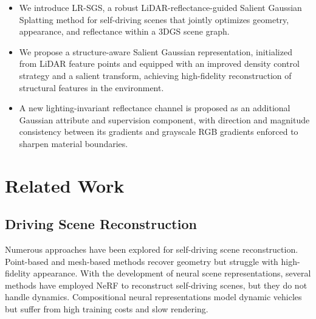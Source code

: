\documentclass[letterpaper, 10 pt, conference]{ieeeconf}  %
\begin{document}
\begin{itemize}

\item We introduce LR-SGS, a robust LiDAR-reflectance-guided Salient Gaussian Splatting method for self-driving scenes that jointly optimizes geometry, appearance, and reflectance within a 3DGS scene graph.

\item We propose a structure-aware Salient Gaussian representation, initialized from LiDAR feature points and equipped with an improved density control strategy and a salient transform, achieving high-fidelity reconstruction of structural features in the environment.

\item A new lighting-invariant reflectance channel is proposed as an additional Gaussian attribute and supervision component, with direction and magnitude consistency between its gradients and grayscale RGB gradients enforced to sharpen material boundaries.

\end{itemize}


\section{Related Work}
\subsection{Driving Scene Reconstruction}

Numerous approaches have been explored for self-driving scene reconstruction. Point-based \cite{ref26,ref27} and mesh-based \cite{ref28} methods recover geometry but struggle with high-fidelity appearance. With the development of neural scene representations, several methods \cite{ref7,ref13, ref14, ref35} have employed NeRF \cite{ref2} to reconstruct self-driving scenes, but they do not handle dynamics. Compositional neural representations \cite{ref34,ref16,ref17,ref18,ref22} model dynamic vehicles but suffer from high training costs and slow rendering. 
\end{document}
